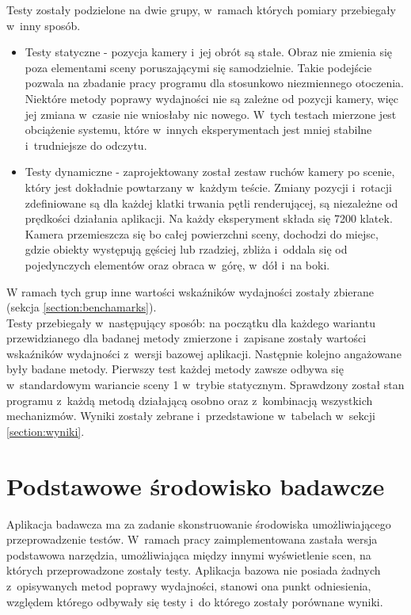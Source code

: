 \documentclass[a4paper,twoside,12pt]{book}
\begin{document}
Testy zostały podzielone na dwie grupy, w~ramach których pomiary przebiegały w~inny sposób.
\begin{itemize}
    \item Testy statyczne - pozycja kamery i~jej obrót są stałe. Obraz nie zmienia się poza elementami sceny poruszającymi się samodzielnie. Takie podejście pozwala na zbadanie pracy programu dla stosunkowo niezmiennego otoczenia. Niektóre metody poprawy wydajności nie są zależne od pozycji kamery, więc jej zmiana w~czasie nie wniosłaby nic nowego. W~tych testach mierzone jest obciążenie systemu, które w~innych eksperymentach jest mniej stabilne i~trudniejsze do odczytu.
    \item Testy dynamiczne - zaprojektowany został zestaw ruchów kamery po scenie, który jest dokładnie powtarzany w~każdym teście. Zmiany pozycji i~rotacji zdefiniowane są dla każdej klatki trwania pętli renderującej, są niezależne od prędkości działania aplikacji. Na każdy eksperyment składa się 7200 klatek. Kamera przemieszcza się bo całej powierzchni sceny, dochodzi do miejsc, gdzie obiekty występują gęściej lub rzadziej, zbliża i~oddala się od pojedynczych elementów oraz obraca w~górę, w~dół i~na boki.
\end{itemize}
W ramach tych grup inne wartości wskaźników wydajności zostały zbierane (sekcja \ref{section:benchamarks}).\\
Testy przebiegały w~następujący sposób: na początku dla każdego wariantu przewidzianego dla badanej metody zmierzone i~zapisane zostały wartości wskaźników wydajności z~wersji bazowej aplikacji. Następnie kolejno angażowane były badane metody. Pierwszy test każdej metody zawsze odbywa się w~standardowym wariancie sceny 1 w~trybie statycznym. Sprawdzony został stan programu z~każdą metodą działającą osobno oraz z~kombinacją wszystkich mechanizmów. Wyniki zostały zebrane i~przedstawione w~tabelach w~sekcji \ref{section:wyniki}.

\section{Podstawowe środowisko badawcze}
Aplikacja badawcza ma za zadanie skonstruowanie środowiska umożliwiającego przeprowadzenie testów. W~ramach pracy zaimplementowana zastała wersja podstawowa narzędzia, umożliwiająca między innymi wyświetlenie scen, na których przeprowadzone zostały testy. Aplikacja bazowa nie posiada żadnych z~opisywanych metod poprawy wydajności, stanowi ona punkt odniesienia, względem którego odbywały się testy i~do którego zostały porównane wyniki. \\
\end{document}
